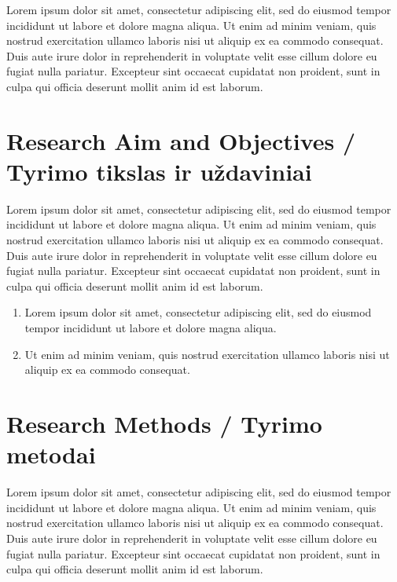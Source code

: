 Lorem ipsum dolor sit amet, consectetur adipiscing elit, sed do eiusmod tempor incididunt ut labore et dolore magna aliqua. Ut enim ad minim veniam, quis nostrud exercitation ullamco laboris nisi ut aliquip ex ea commodo consequat. Duis aute irure dolor in reprehenderit in voluptate velit esse cillum dolore eu fugiat nulla pariatur. Excepteur sint occaecat cupidatat non proident, sunt in culpa qui officia deserunt mollit anim id est laborum.



\section*{Research Aim and Objectives / Tyrimo tikslas ir uždaviniai}

Lorem ipsum dolor sit amet, consectetur adipiscing elit, sed do eiusmod tempor incididunt ut labore et dolore magna aliqua. Ut enim ad minim veniam, quis nostrud exercitation ullamco laboris nisi ut aliquip ex ea commodo consequat. Duis aute irure dolor in reprehenderit in voluptate velit esse cillum dolore eu fugiat nulla pariatur. Excepteur sint occaecat cupidatat non proident, sunt in culpa qui officia deserunt mollit anim id est laborum.

\begin{enumerate}
    \item Lorem ipsum dolor sit amet, consectetur adipiscing elit, sed do eiusmod tempor incididunt ut labore et dolore magna aliqua. 
    \item  Ut enim ad minim veniam, quis nostrud exercitation ullamco laboris nisi ut aliquip ex ea commodo consequat.
\end{enumerate}


\section*{Research Methods / Tyrimo metodai}

Lorem ipsum dolor sit amet, consectetur adipiscing elit, sed do eiusmod tempor incididunt ut labore et dolore magna aliqua. Ut enim ad minim veniam, quis nostrud exercitation ullamco laboris nisi ut aliquip ex ea commodo consequat. Duis aute irure dolor in reprehenderit in voluptate velit esse cillum dolore eu fugiat nulla pariatur. Excepteur sint occaecat cupidatat non proident, sunt in culpa qui officia deserunt mollit anim id est laborum.


